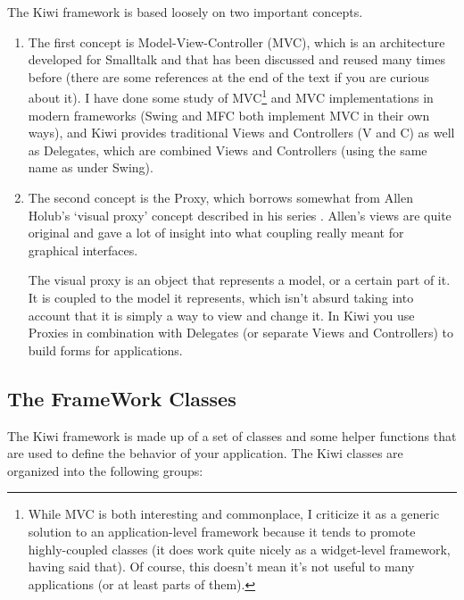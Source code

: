 \documentclass[a4paper]{howto}
\begin{document}
The Kiwi framework is based loosely on two important concepts.

\begin{enumerate}
\item The first concept is Model-View-Controller (MVC), which is an
architecture developed for Smalltalk and that has been discussed and
reused many times before (there are some references at the end of the
text if you are curious about it). I have done some study of
MVC\footnote{ While MVC is both interesting and commonplace, I criticize
it as a generic solution to an application-level framework because it
tends to promote highly-coupled classes (it does work quite nicely as a
widget-level framework, having said that).
Of course, this doesn't mean it's not useful to many applications (or at
least parts of them).} and MVC implementations in modern frameworks
(Swing and MFC both implement MVC in their own ways), and Kiwi provides
traditional Views and Controllers (V and C) as well as Delegates, which
are combined Views and Controllers (using the same name as under Swing).

\item The second concept is the Proxy, which borrows somewhat from Allen
Holub's `visual proxy' concept described in his series
. Allen's views
are quite original and gave a lot of insight into what coupling really
meant for graphical interfaces.

The visual proxy is an object that represents a model, or a certain part
of it. It is coupled to the model it represents, which isn't absurd
taking into account that it is simply a way to view and change it. In
Kiwi you use Proxies in combination with Delegates (or separate Views
and Controllers) to build forms for applications.
\end{enumerate}

\subsection{The FrameWork Classes}

The Kiwi framework is made up of a set of classes and some helper
functions that are used to define the behavior of your application.
The Kiwi classes are organized into the following groups:
\end{document}

